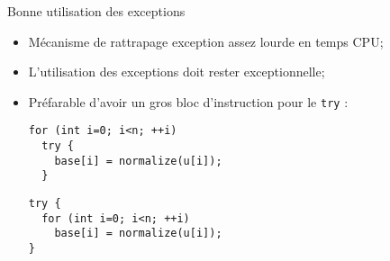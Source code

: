 \documentclass[compress,10pt,aspectratio=169]{beamer}
\begin{document}
\begin{frame}[fragile]{Bonne utilisation des exceptions}
  \scriptsize
    
  \begin{itemize}
  \item Mécanisme de rattrapage exception assez lourde en temps CPU;
  \item L'utilisation des exceptions doit rester exceptionnelle;
  \item Préfarable d'avoir un gros bloc d'instruction pour le \texttt{try} :
  \begin{multicols}{2}
    \begin{tcolorbox}[colback=red!5!white,colframe=red!30!black, title=Mauvaise utilisation]
\begin{verbatim}
for (int i=0; i<n; ++i)
  try {
    base[i] = normalize(u[i]);
  }
\end{verbatim}
    \end{tcolorbox}
    \columnbreak
    \begin{tcolorbox}[colback=green!5!white,colframe=green!10!black, title=Bonne utilisation]
\begin{verbatim}
try {
  for (int i=0; i<n; ++i)
    base[i] = normalize(u[i]);
}
\end{verbatim}
\end{tcolorbox}
\end{multicols}
\end{itemize}
\end{frame}
\end{document}
